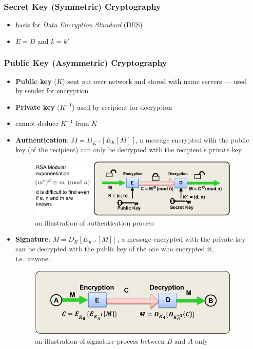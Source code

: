 \documentclass[twocolumn,landscape,10pt]{article}
\theoremstyle{definition}
\begin{document}
\subsubsection{Secret Key (Symmetric) Cryptography}

\begin{itemize}
    \item basis for \emph{Data Encryption Standard} (DES)
    \item $E=D$ and $k=k'$
\end{itemize} 

\subsubsection{Public Key (Asymmetric) Cryptography}

\begin{itemize}
    \item \textbf{Public key} ($K$) sent out over network and stored with name
        servers --- used by sender for encryption
    \item \textbf{Private key} ($K^{-1}$) used by recipient for decryption
    \item cannot deduce $K^{-1}$ from $K$
    \item \textbf{Authentication}: $M=D_{K^{-1}}[E_K[M]]$, a message encrypted
        with the public key (of the recipient) 
        can only be decrypted with the recipient's private key.
        \begin{figure}[h]
          	\includegraphics[scale=0.30]{authentication.png}
          	\centering
            \caption{an illustration of authentication process}
        \end{figure}
    \item \textbf{Signature}: $M=D_{K}[E_{K^{-1}}[M]]$, a message encrypted with
        the private key can be decrypted with the public key of the one who
        encrypted it, i.e.\ anyone.
        \begin{figure}
          	\includegraphics[scale=0.30]{signature.png}
          	\centering
          	\caption{an illustration of signature process between $B$ and $A$ only}
        \end{figure}
\end{itemize} 
\end{document}
